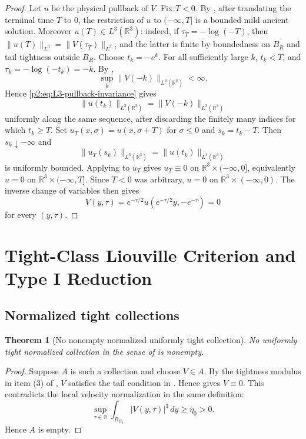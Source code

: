 \documentclass[11pt]{amsart}
\theoremstyle{plain}
\newtheorem{theorem}{Theorem}[section]
\theoremstyle{definition}
\theoremstyle{remark}
\numberwithin{equation}{section}
\newcommand{\R}{\mathbb R}
\begin{document}
\begin{proof}
Let \(u\) be the physical pullback of \(V\).  Fix \(T<0\).  By
, after translating the terminal time \(T\) to \(0\),
the restriction of \(u\) to \((-\infty,T]\) is a bounded mild ancient
solution.  Moreover \(u(T)\in L^3(\R^3)\): indeed, if
\(\tau_T=-\log(-T)\), then \(\|u(T)\|_{L^3}=\|V(\tau_T)\|_{L^3}\), and the
latter is finite by boundedness on \(B_R\) and tail tightness outside \(B_R\).
Choose \(t_k=-e^k\).  For all sufficiently large \(k\), \(t_k<T\),
and \(\tau_k=-\log(-t_k)=-k\).  By
,
\[
   \sup_k\|V(-k)\|_{L^3(\R^3)}<\infty .
\]
Hence \eqref{p2:eq:L3-pullback-invariance} gives
\[
   \|u(t_k)\|_{L^3(\R^3)}
   =
   \|V(-k)\|_{L^3(\R^3)}
\]
uniformly along the same sequence, after discarding the finitely many indices
for which \(t_k\ge T\).
Set \(u_T(x,\sigma)=u(x,\sigma+T)\) for \(\sigma\le0\) and
\(s_k=t_k-T\).  Then \(s_k\downarrow-\infty\) and
\[
   \|u_T(s_k)\|_{L^3(\R^3)}
   =
   \|u(t_k)\|_{L^3(\R^3)}
\]
is uniformly bounded.  Applying  to \(u_T\) gives
\(u_T\equiv0\) on \(\R^3\times(-\infty,0]\), equivalently \(u=0\) on
\(\R^3\times(-\infty,T]\).  Since \(T<0\) was arbitrary, \(u=0\) on
\(\R^3\times(-\infty,0)\).  The inverse change of variables then gives
\[
   V(y,\tau)=e^{-\tau/2}u(e^{-\tau/2}y,-e^{-\tau})=0
\]
for every \((y,\tau)\).
\end{proof}

\section{Tight-Class Liouville Criterion and Type I Reduction}
\label{p2:sec:tight-liouville-interface}

\subsection{Normalized tight collections}

\begin{theorem}[No nonempty normalized uniformly tight collection]
\label{p2:thm:no-tight-normalized-collection}
No uniformly tight normalized collection in the sense of
 is nonempty.
\end{theorem}

\begin{proof}
Suppose \(A\) is such a collection and choose \(V\in A\).  By the tightness
modulus in item \textup{(3)} of , \(V\)
satisfies the tail condition in .  Hence
 gives \(V\equiv0\).  This contradicts the local
velocity normalization in the same definition:
\[
   \sup_{\tau\in\R}
   \int_{B_{R_0}}|V(y,\tau)|^3\,dy\ge\eta_0>0 .
\]
Hence \(A\) is empty.
\end{proof}
\end{document}
